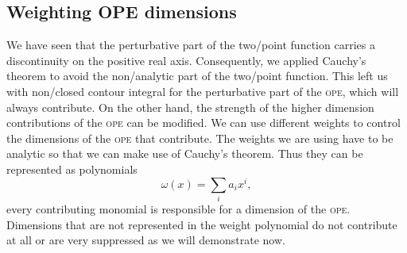 \documentclass[../../index.tex]{subfiles}
\begin{document}
\subsection{Weighting OPE dimensions}
We have seen that the perturbative part of the two\-/point function carries a
discontinuity on the positive real axis. Consequently, we applied Cauchy's
theorem to avoid the non\-/analytic part of the two\-/point function. This left
us with non\-/closed contour integral for the perturbative part of the
\textsc{ope}, which will always contribute. On the other hand, the strength of
the higher dimension contributions of the \textsc{ope} can be modified. We can
use different weights to control the dimensions of the \textsc{ope} that
contribute. The weights we are using have to be analytic so that we can make
use of Cauchy's theorem. Thus they can be represented as polynomials
\begin{equation}
  \omega(x) = \sum_i a_i x^i,
\end{equation}
every contributing monomial is responsible for a dimension of the \textsc{ope}.
Dimensions that are not represented in the weight polynomial do not contribute
at all or are very suppressed as we will demonstrate now.
\end{document}
